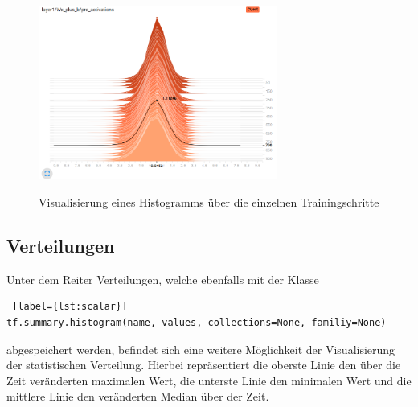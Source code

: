 \vspace{0.6cm}
\begin{figure}[h!]
	\centering
	 \includegraphics[width=0.7\textwidth]{images/Kapitel_3/histogram.png}\\
	\vspace{10pt} 
	\caption[Visualisierung eines Histogramms über die einzelnen Trainingsschritte]{Visualisierung eines Histogramms über die einzelnen Trainingschritte}
	\label{fig:histogram}
\end{figure}






\subsection{Verteilungen}
\vspace{10pt}

Unter dem Reiter Verteilungen, welche ebenfalls mit der Klasse
\\

\begin{minipage}{\linewidth}
\begin{lstlisting} [label={lst:scalar}]
tf.summary.histogram(name, values, collections=None, familiy=None)
\end{lstlisting}
\end{minipage}
\vspace{0.2cm}

abgespeichert werden, befindet sich eine weitere Möglichkeit der Visualisierung der statistischen Verteilung. Hierbei repräsentiert die oberste Linie den über die Zeit veränderten maximalen Wert, die unterste Linie den minimalen Wert und die mittlere Linie den veränderten Median über der Zeit.


